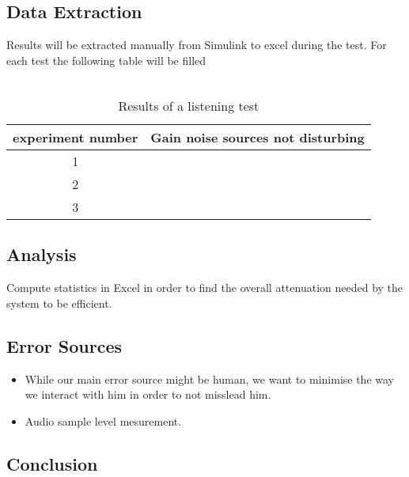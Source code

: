 \subsection{Data Extraction}
Results will be extracted manually from Simulink to excel during the test.
For each test the following table will be filled \\\\
\begin{table} [h]
\centering
	\begin{tabular}{c  c } \toprule
		experiment number & Gain noise sources not disturbing  \\ \toprule
		1 &   \\
		2 &   \\
		3 &   \\ \bottomrule
	\end{tabular}
	\caption{Results of a listening test}
	\label{tab:ListeningRes}
\end{table}

\subsection{Analysis}
Compute statistics in Excel in order to find the overall attenuation needed by the system to be efficient.

\subsection{Error Sources}
\begin{itemize}
\item While our main error source might be human, we want to minimise the way we interact with him in order to not misslead him.
\item Audio sample level mesurement.
\end{itemize}

\vspace{1cm}
\subsection{Conclusion}



